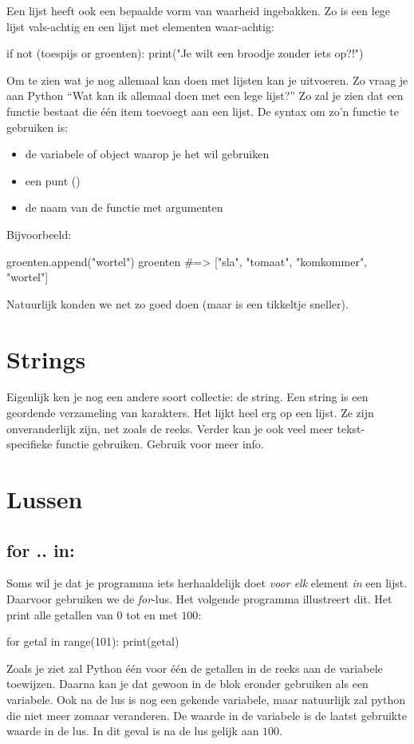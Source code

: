   Een lijst heeft ook een bepaalde vorm van waarheid ingebakken. Zo is een lege
  lijst vals-achtig en een lijst met elementen waar-achtig:
  \begin{python}
    if not (toespijs or groenten):
      print("Je wilt een broodje zonder iets op?!")
  \end{python}
  Om te zien wat je nog allemaal kan doen met lijsten kan je 
  uitvoeren. Zo vraag je aan Python ``Wat kan ik allemaal doen met een lege
  lijst?'' Zo zal je zien dat een functie  bestaat die \'e\'en item
  toevoegt aan een lijst. De syntax om zo'n functie te gebruiken is:
  \begin{itemize}
  \item de variabele of object waarop je het wil gebruiken
  \item een punt ()
  \item de naam van de functie met argumenten
  \end{itemize}
  Bijvoorbeeld:
  \begin{python}
    groenten.append("wortel")
    groenten #=> ["sla", "tomaat", "komkommer", "wortel"]
  \end{python}
  Natuurlijk konden we net zo goed  doen (maar
   is een tikkeltje sneller).

\section{Strings}
  Eigenlijk ken je nog een andere soort collectie: de string. Een string is een
  geordende verzameling van karakters. Het lijkt heel erg op een lijst. Ze zijn
  onveranderlijk zijn, net zoals de reeks. Verder kan je ook veel meer
  tekst-specifieke functie gebruiken. Gebruik  voor
  meer info.


\section{Lussen}
  \subsection{for .. in:}
  Soms wil je dat je programma iets herhaaldelijk doet \emph{voor elk} element
  \emph{in} een lijst. Daarvoor gebruiken we de \emph{for}-lus. Het volgende
  programma illustreert dit. Het print alle getallen van $0$ tot en met $100$:
  \begin{python}
    for getal in range(101):
      print(getal)
  \end{python}
  Zoals je ziet zal Python \'e\'en voor \'e\'en de getallen in de reeks aan de
  variabele  toewijzen. Daarna kan je dat gewoon in de blok eronder
  gebruiken als een variabele. Ook na de lus is  nog een gekende
  variabele, maar natuurlijk zal python die niet meer zomaar veranderen. De
  waarde in de variabele is de laatst gebruikte waarde in de lus. In dit
  geval is  na de lus gelijk aan $100$.

